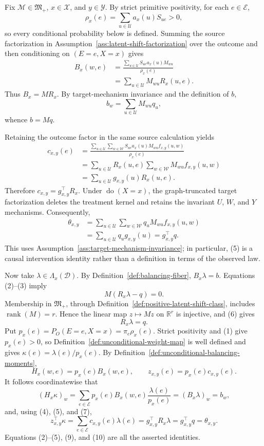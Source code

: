 Fix \(\mathcal M\in\mathfrak M_{+}\), \(x\in\mathcal X\), and \(y\in\mathcal Y\). By strict primitive positivity, for each \(e\in\mathcal E\),
\[
\rho_x(e)=\sum_{u\in\mathcal U}a_x(u)S_{ue}>0,
\tag{1}
\]
so every conditional probability below is defined. Summing the source factorization in Assumption~\ref{ass:latent-shift-factorization} over the outcome and then conditioning on \((E=e,X=x)\) gives
\[
\begin{aligned}
B_x(w,e)
&=\frac{\sum_{u\in\mathcal U}S_{ue}a_x(u)M_{wu}}{\rho_x(e)}\\
&=\sum_{u\in\mathcal U}M_{wu}R_x(u,e).
\end{aligned}
\tag{2}
\]
Thus \(B_x=MR_x\). By target-mechanism invariance and the definition of \(b\),
\[
b_w=\sum_{u\in\mathcal U}M_{wu}q_u,
\tag{3}
\]
whence \(b=Mq\).

Retaining the outcome factor in the same source calculation yields
\[
\begin{aligned}
c_{x,y}(e)
&=\frac{\sum_{u\in\mathcal U}\sum_{w\in\mathcal W}
 S_{ue}a_x(u)M_{wu}f_{x,y}(u,w)}{\rho_x(e)}\\
&=\sum_{u\in\mathcal U}R_x(u,e)
   \sum_{w\in\mathcal W}M_{wu}f_{x,y}(u,w)\\
&=\sum_{u\in\mathcal U}g_{x,y}(u)R_x(u,e).
\end{aligned}
\tag{4}
\]
Therefore \(c_{x,y}=g_{x,y}^{\top}R_x\). Under \(\operatorname{do}(X=x)\), the graph-truncated target factorization deletes the treatment kernel and retains the invariant \(U\), \(W\), and \(Y\) mechanisms. Consequently,
\[
\begin{aligned}
\theta_{x,y}
&=\sum_{u\in\mathcal U}\sum_{w\in\mathcal W}
 q_uM_{wu}f_{x,y}(u,w)\\
&=\sum_{u\in\mathcal U}q_ug_{x,y}(u)
=g_{x,y}^{\top}q.
\end{aligned}
\tag{5}
\]
This uses Assumption~\ref{ass:target-mechanism-invariance}; in particular, (5) is a causal intervention identity rather than a definition in terms of the observed law.

Now take \(\lambda\in\Lambda_x(\mathcal D)\). By Definition~\ref{def:balancing-fiber}, \(B_x\lambda=b\). Equations (2)--(3) imply
\[
M(R_x\lambda-q)=0.
\tag{6}
\]
Membership in \(\mathfrak M_{+}\), through Definition~\ref{def:positive-latent-shift-class}, includes \(\operatorname{rank}(M)=r\). Hence the linear map \(z\mapsto Mz\) on \(\mathbb R^r\) is injective, and (6) gives
\[
R_x\lambda=q.
\tag{7}
\]
Put \(p_x(e)=P_O(E=e,X=x)=\pi_e\rho_x(e)\). Strict positivity and (1) give \(p_x(e)>0\), so Definition~\ref{def:unconditional-weight-map} is well defined and gives \(\kappa(e)=\lambda(e)/p_x(e)\). By Definition~\ref{def:unconditional-balancing-moments},
\[
H_x(w,e)=p_x(e)B_x(w,e),\qquad
z_{x,y}(e)=p_x(e)c_{x,y}(e).
\tag{8}
\]
It follows coordinatewise that
\[
(H_x\kappa)_w
=\sum_{e\in\mathcal E}p_x(e)B_x(w,e)\frac{\lambda(e)}{p_x(e)}
=(B_x\lambda)_w=b_w,
\tag{9}
\]
and, using (4), (5), and (7),
\[
z_{x,y}^{\top}\kappa
=\sum_{e\in\mathcal E}c_{x,y}(e)\lambda(e)
=g_{x,y}^{\top}R_x\lambda
=g_{x,y}^{\top}q
=\theta_{x,y}.
\tag{10}
\]
Equations (2)--(5), (9), and (10) are all the asserted identities.